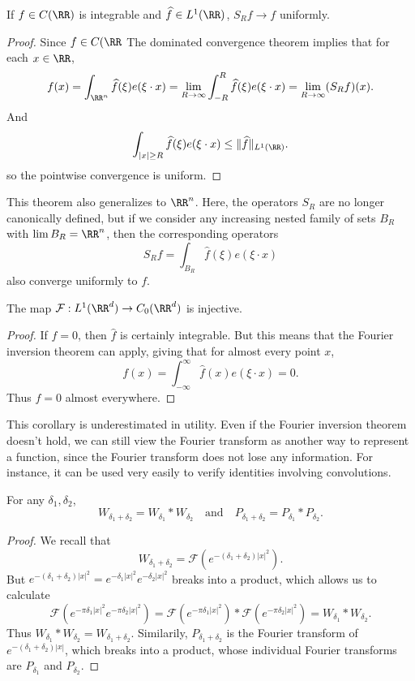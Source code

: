 \begin{corollary}
	If $f \in C(\RR)$ is integrable and $\widehat{f} \in L^1(\RR)$, $S_R f \to f$  uniformly.
\end{corollary}
\begin{proof}
	Since $f \in C(\RR$
	The dominated convergence theorem implies that for each $x \in\RR$,
	\[ f(x) = \int_{\RR^n} \widehat{f}(\xi) e(\xi \cdot x) = \lim_{R \to \infty} \int_{-R}^R \widehat{f}(\xi) e(\xi \cdot x) = \lim_{R \to \infty} (S_R f)(x). \]
	And
	\[ \int_{|x| \geq R} \widehat{f}(\xi) e(\xi \cdot x) \leq \| \widehat{f} \|_{L^1(\RR)}. \]
	so the pointwise convergence is uniform.
\end{proof}

\begin{remark}
	This theorem also generalizes to $\RR^n$. Here, the operators $S_R$ are no longer canonically defined, but if we consider any increasing nested family of sets $B_R$ with $\lim B_R = \RR^n$, then the corresponding operators
	\[ S_R f = \int_{B_R} \widehat{f}(\xi) e(\xi \cdot x) \]
	also converge uniformly to $f$.
\end{remark}

\begin{corollary}
	The map $\mathcal{F}: L^1(\RR^d) \to C_0(\RR^d)$ is injective.
\end{corollary}
\begin{proof}
	If $\widehat{f} = 0$, then $\widehat{f}$ is certainly integrable. But this means that the Fourier inversion theorem can apply, giving that for almost every point $x$,
	\[ f(x) = \int_{-\infty}^\infty \widehat{f}(x) e(\xi \cdot x) = 0. \]
	Thus $f = 0$ almost everywhere.
\end{proof}

This corollary is underestimated in utility. Even if the Fourier inversion theorem doesn't hold, we can still view the Fourier transform as another way to represent a function, since the Fourier transform does not lose any information. For instance, it can be used very easily to verify identities involving convolutions.

\begin{corollary}
	For any $\delta_1, \delta_2$,
	\[ W_{\delta_1 + \delta_2} = W_{\delta_1} * W_{\delta_2}\quad\text{and}\quad P_{\delta_1 + \delta_2} = P_{\delta_1} * P_{\delta_2}. \]
\end{corollary}
\begin{proof}
	We recall that
	\[ W_{\delta_1 + \delta_2} = \mathcal{F}(e^{-(\delta_1 + \delta_2) |x|^2}). \]
	But $e^{-(\delta_1 + \delta_2) |x|^2} = e^{-\delta_1 |x|^2} e^{-\delta_2 |x|^2}$ breaks into a product, which allows us to calculate
	\[ \mathcal{F}(e^{-\pi \delta_1 |x|^2} e^{-\pi \delta_2 |x|^2}) = \mathcal{F}(e^{-\pi \delta_1 |x|^2}) * \mathcal{F}(e^{-\pi \delta_2 |x|^2}) = W_{\delta_1} * W_{\delta_2}.  \]
	Thus $W_{\delta_1} * W_{\delta_2} = W_{\delta_1 + \delta_2}$. Similarily, $P_{\delta_1 + \delta_2}$ is the Fourier transform of $e^{-(\delta_1 + \delta_2)|x|}$, which breaks into a product, whose individual Fourier transforms are $P_{\delta_1}$ and $P_{\delta_2}$.
\end{proof}

